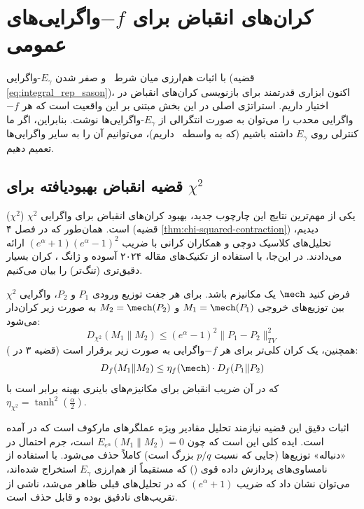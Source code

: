 \section{کران‌های انقباض برای $-f$واگرایی‌های عمومی}
\label{sec:contraction-general}

با اثبات هم‌ارزی میان شرط \LDP\ و صفر شدن $E_\gamma$-واگرایی (قضیه \ref{eq:integral_rep_sason})، اکنون ابزاری قدرتمند برای بازنویسی کران‌های انقباض در اختیار داریم. استراتژی اصلی در این بخش مبتنی بر این واقعیت است که هر $-f$واگرایی محدب را می‌توان به صورت انتگرالی از $E_\gamma$-واگرایی‌ها نوشت. بنابراین، اگر ما کنترلی روی $E_\gamma$ داشته باشیم (که به واسطه \LDP\ داریم)، می‌توانیم آن را به سایر واگرایی‌ها تعمیم دهیم.

\subsection{قضیه انقباض بهبودیافته برای $\chi^2$}
یکی از مهم‌ترین نتایج این چارچوب جدید، بهبود کران‌های انقباض برای واگرایی $\chi^2$ ($\chi^2$) است. همان‌طور که در فصل ۴ (قضیه \ref{thm:chi-squared-contraction}) دیدیم، تحلیل‌های کلاسیک دوچی و همکاران کرانی با ضریب $(e^\alpha + 1)(e^\alpha - 1)^2$ ارائه می‌دادند. در این‌جا، با استفاده از تکنیک‌های مقاله ۲۰۲۴ آسوده و ژانگ \cite{Asoodeh2024}، کران بسیار دقیق‌تری (تنگ‌تر) را بیان می‌کنیم.

\begin{قضیه}
\label{thm:sharp-chi-square}
فرض کنید $\mech$ یک مکانیزم \LDP باشد. برای هر جفت توزیع ورودی $P_1$ و $P_2$، واگرایی $\chi^2$ بین توزیع‌های خروجی $M_1 = \mech(P_1)$ و $M_2 = \mech(P_2)$ به صورت زیر کران‌دار می‌شود:
\begin{equation}
\label{eq:sharp-chi-bound}
D_{\chi^2}(M_1 \| M_2) \le (e^\alpha - 1)^2 \|P_1 - P_2\|_{TV}^2
\end{equation}
همچنین، یک کران کلی‌تر برای هر $-f$واگرایی به صورت زیر برقرار است (قضیه ۳ در \cite{Asoodeh2024}):
\begin{equation}
D_f(M_1 \| M_2) \le \eta_f(\mech) \cdot D_f(P_1 \| P_2)
\end{equation}
که در آن ضریب انقباض برای مکانیزم‌های باینری بهینه برابر است با $\eta_{\chi^2} = \tanh^2(\frac{\alpha}{2})$.
\end{قضیه}

\begin{اثبات}
اثبات دقیق این قضیه نیازمند تحلیل مقادیر ویژه عملگرهای مارکوف است که در \cite{Asoodeh2024} آمده است. ایده کلی این است که چون $E_{e^\alpha}(M_1 \| M_2) = 0$ است، جرم احتمال در «دنباله» توزیع‌ها (جایی که نسبت $p/q$ بزرگ است) کاملاً حذف می‌شود. با استفاده از نامساوی‌های پردازش داده قوی () که مستقیماً از هم‌ارزی $E_\gamma$ استخراج شده‌اند، می‌توان نشان داد که ضریب $(e^\alpha+1)$ که در تحلیل‌های قبلی ظاهر می‌شد، ناشی از تقریب‌های نادقیق بوده و قابل حذف است.
\end{اثبات}

